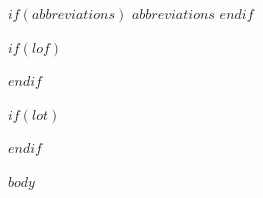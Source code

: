 \documentclass[a4paper,12pt]{article}
\begin{document}
$if(abbreviations)$
\newpage
$abbreviations$
$endif$

$if(lof)$
\newpage
\listoffigures
{}
$endif$

$if(lot)$
\newpage
\listoftables
{}
$endif$

\newpage
\pagestyle{plain}
\setcounter{page}{1}    				%

$body$

\end{document}
